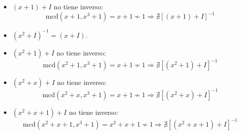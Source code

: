 \documentclass[12pt]{article}
\begin{document}
\begin{ejercicio}
\begin{itemize}
            \item $(x+1)+I$ no tiene inverso:
                $$\mbox{mcd}(x+1,x^3+1)=x+1 \nsim 1 \Rightarrow \nexists[(x+1)+I]^{-1}$$
            \item $(x^2+I)^{-1} = (x+I)$.
            \item $(x^2+1)+I$ no tiene inverso:
                $$\mbox{mcd}(x^2+1, x^3+1) = x+1 \nsim 1 \Rightarrow \nexists [(x^2+1)+I]^{-1}$$
            \item $(x^2+x)+I$ no tiene inverso:
                $$\mbox{mcd}(x^2+x, x^3+1) = x+1 \nsim 1 \Rightarrow \nexists [(x^2+x)+I]^{-1}$$
            \item $(x^2+x+1)+I$ no tiene inverso:
                $$\mbox{mcd}(x^2+x+1, x^3+1) = x^2+x+1 \nsim 1 \Rightarrow \nexists [(x^2+x+1)+I]^{-1}$$


        \end{itemize}
    \end{ejercicio}
\end{document}
